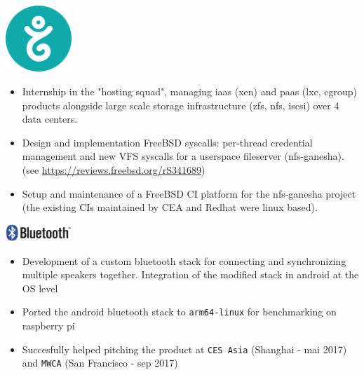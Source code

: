\noindent
\begin{minipage}{.15\textwidth}
    \centerline{\includegraphics[width=25mm]{img/gandi}}
\end{minipage}%
\hspace{5mm}
\begin{minipage}{.8\textwidth}
    \raggedright
    \begin{itemize}
	\item Internship in the "hosting squad", managing iaas (xen) and paas (lxc, cgroup) products alongside large scale storage infrastructure (zfs, nfs, iscsi) over 4 data centers.
	\item Design and implementation FreeBSD syscalls: per-thread credential management and new VFS syscalls for a userspace fileserver (nfs-ganesha).\newline (see \url{https://reviews.freebsd.org/rS341689})
	\item Setup and maintenance of a FreeBSD CI platform for the nfs-ganesha project (the existing CIs maintained by CEA and Redhat were linux based).
    \end{itemize}
\end{minipage}

\noindent
\begin{minipage}{.15\textwidth}
    \centerline{\includegraphics[width=25mm]{img/bluetooth}}
\end{minipage}%
\hspace{5mm}
\begin{minipage}{.8\textwidth}
    \raggedright
    \begin{itemize}
	\item Development of a custom bluetooth stack for connecting and synchronizing multiple speakers together. Integration of the modified stack in android at the OS level
	\item Ported the android bluetooth stack to \texttt{arm64-linux} for benchmarking on raspberry pi
	\item Succesfully helped pitching the product at \texttt{CES Asia} (Shanghai - mai 2017) and \texttt{MWCA} (San Francisco - sep 2017)
    \end{itemize}
\end{minipage}

